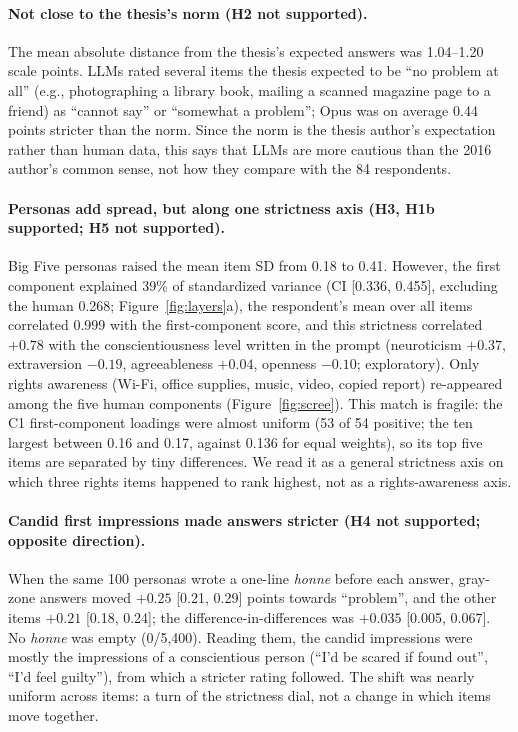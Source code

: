 \documentclass[11pt]{article}
\begin{document}
\paragraph{Not close to the thesis's norm (H2 not supported).}
The mean absolute distance from the thesis's expected answers was 1.04--1.20 scale points. LLMs rated several items the thesis expected to be ``no problem at all'' (e.g., photographing a library book, mailing a scanned magazine page to a friend) as ``cannot say'' or ``somewhat a problem''; Opus was on average 0.44 points stricter than the norm. Since the norm is the thesis author's expectation rather than human data, this says that LLMs are more cautious than the 2016 author's common sense, not how they compare with the 84 respondents.

\paragraph{Personas add spread, but along one strictness axis (H3, H1b supported; H5 not supported).}
Big Five personas raised the mean item SD from 0.18 to 0.41. However, the first component explained 39\% of standardized variance (CI [0.336, 0.455], excluding the human 0.268; Figure~\ref{fig:layers}a), the respondent's mean over all items correlated 0.999 with the first-component score, and this strictness correlated $+0.78$ with the conscientiousness level written in the prompt (neuroticism $+0.37$, extraversion $-0.19$, agreeableness $+0.04$, openness $-0.10$; exploratory). Only rights awareness (Wi-Fi, office supplies, music, video, copied report) re-appeared among the five human components (Figure~\ref{fig:scree}). This match is fragile: the C1 first-component loadings were almost uniform (53 of 54 positive; the ten largest between 0.16 and 0.17, against 0.136 for equal weights), so its top five items are separated by tiny differences. We read it as a general strictness axis on which three rights items happened to rank highest, not as a rights-awareness axis.

\paragraph{Candid first impressions made answers stricter (H4 not supported; opposite direction).}
When the same 100 personas wrote a one-line \emph{honne} before each answer, gray-zone answers moved $+0.25$ [0.21, 0.29] points towards ``problem'', and the other items $+0.21$ [0.18, 0.24]; the difference-in-differences was $+0.035$ [0.005, 0.067]. No \emph{honne} was empty (0/5{,}400). Reading them, the candid impressions were mostly the impressions of a conscientious person (``I'd be scared if found out'', ``I'd feel guilty''), from which a stricter rating followed. The shift was nearly uniform across items: a turn of the strictness dial, not a change in which items move together.
\end{document}
